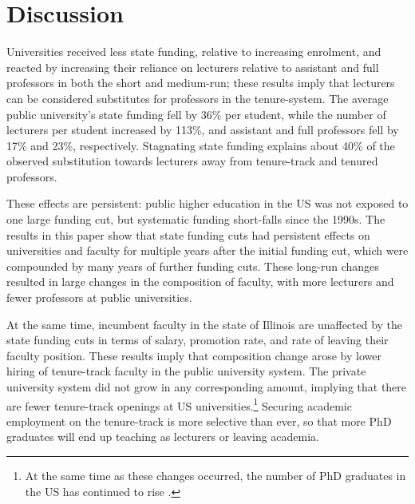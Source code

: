 \section{Discussion}
\label{sec:discussion}

Universities received less state funding, relative to increasing enrolment, and reacted by increasing their reliance on lecturers relative to assistant and full professors in both the short and medium-run; these results imply that lecturers can be considered substitutes for professors in the tenure-system.
The average public university's state funding fell by 36\% per student, while the number of lecturers per student increased by 113\%, and assistant and full professors  fell by 17\% and 23\%, respectively.
Stagnating state funding explains about 40\% of the observed substitution towards lecturers away from tenure-track and tenured professors.

These effects are persistent: public higher education in the US was not exposed to one large funding cut, but systematic funding short-falls since the 1990s.
The results in this paper show that state funding cuts had persistent effects on universities and faculty for multiple years after the initial funding cut, which were compounded by many years of further funding cuts.
These long-run changes resulted in large changes in the composition of faculty, with more lecturers and fewer professors at public universities.

At the same time, incumbent faculty in the state of Illinois are unaffected by the state funding cuts in terms of salary, promotion rate, and rate of leaving their faculty position.
These results imply that composition change arose by lower hiring of tenure-track faculty in the public university system.
The private university system did not grow in any corresponding amount, implying that there are fewer tenure-track openings at US universities.\footnote{
    At the same time as these changes occurred, the number of PhD graduates in the US has continued to rise \citep{aau2021survey,wapman2022quantifying}.
}
Securing academic employment on the tenure-track is more selective than ever, so that more PhD graduates will end up teaching as lecturers or leaving academia.

